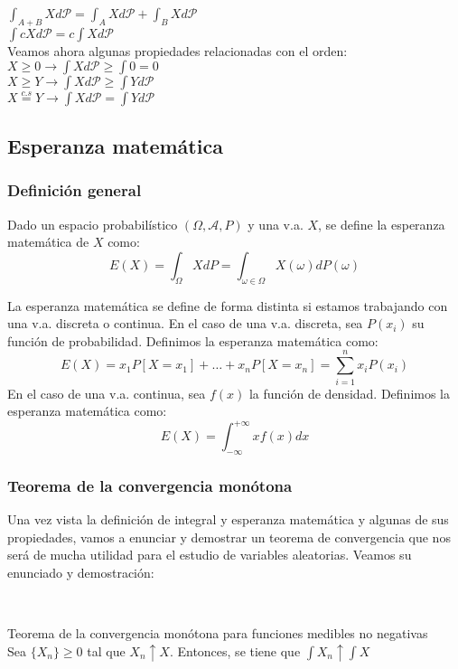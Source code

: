 $\displaystyle \int_{A+B} X d\mathcal{P} = \int_A X d\mathcal{P} + \int_B X d \mathcal{P}$\\

$\displaystyle \int cXd\mathcal{P} = c\int Xd\mathcal{P}$\\

Veamos ahora algunas propiedades relacionadas con el orden:\\

$X \geq 0 \rightarrow \displaystyle \int X d\mathcal{P} \geq \int 0 = 0$\\

$X \geq Y \rightarrow \displaystyle \int X d\mathcal{P} \geq \int Y d\mathcal{P}$\\

$\displaystyle X \stackrel{c.s}{=} Y \rightarrow \int X d\mathcal{P} = \int Y d\mathcal{P}$\\

\subsection{Esperanza matemática}

\subsubsection{Definición general}

Dado un espacio probabilístico $(\Omega, \mathcal{A}, P)$ y una v.a. $X$, se define la esperanza matemática de $X$ como:
$$E(X)=\int_{\Omega}XdP=\int_{\omega \in \Omega}{X(\omega)dP(\omega)}$$

La esperanza matemática se define de forma distinta si estamos trabajando con una v.a. discreta o continua. En el caso de una v.a. discreta, sea $P(x_i)$ su función de probabilidad. Definimos la esperanza matemática como:
$$E(X)=x_1P[X=x_1]+\ldots + x_n P[X=x_n]=\sum_{i=1}^{n}{x_i P(x_i)}$$
En el caso de una v.a. continua, sea $f(x)$ la función de densidad. Definimos la esperanza matemática como:
$$E(X)=\int_{-\infty}^{+\infty} {xf(x)dx}$$

\subsubsection{Teorema de la convergencia monótona}

Una vez vista la definición de integral y esperanza matemática y algunas de sus propiedades, vamos a enunciar y demostrar un teorema de convergencia que nos será de mucha utilidad para el estudio de variables aleatorias. Veamos su enunciado y demostración:
\begin{theorem}
  \
  
Teorema de la convergencia monótona para funciones medibles no negativas\\

Sea $\{X_n\} \geq 0$ tal que $X_n \uparrow X$. Entonces, se tiene que $\displaystyle \int X_n \uparrow \int X$
\end{theorem}

